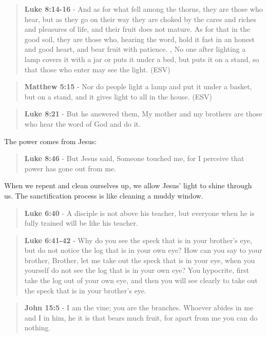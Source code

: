 \documentclass[11pt]{article}
\begin{document}
\begin{quote}
\textbf{Luke 8:14-16} - And as for what fell among the thorns, they are those who hear, but as they go on their way they are choked by the cares and riches and pleasures of life, and their fruit does not mature. As for that in the good soil, they are those who, hearing the word, hold it fast in an honest and good heart, and bear fruit with patience. , No one after lighting a lamp covers it with a jar or puts it under a bed, but puts it on a stand, so that those who enter may see the light. (ESV)
\end{quote}

\begin{quote}
\textbf{Matthew 5:15} - Nor do people light a lamp and put it under a basket, but on a stand, and it gives light to all in the house. (ESV)
\end{quote}

\begin{quote}
\textbf{Luke 8:21} - But he answered them, My mother and my brothers are those who hear the word of God and do it.
\end{quote}

The power comes from Jesus:

\begin{quote}
\textbf{Luke 8:46} - But Jesus said, Someone touched me, for I perceive that power has gone out from me.
\end{quote}

When we repent and clean ourselves up, we allow Jesus' light to shine through us. The sanctification process is like cleaning a muddy window.

\begin{quote}
\textbf{Luke 6:40} - A disciple is not above his teacher, but everyone when he is fully trained will be like his teacher.
\end{quote}

\begin{quote}
\textbf{Luke 6:41-42} - Why do you see the speck that is in your brother's eye, but do not notice the log that is in your own eye? How can you say to your brother, Brother, let me take out the speck that is in your eye, when you yourself do not see the log that is in your own eye? You hypocrite, first take the log out of your own eye, and then you will see clearly to take out the speck that is in your brother's eye.
\end{quote}

\begin{quote}
\textbf{John 15:5} - I am the vine; you are the branches. Whoever abides in me and I in him, he it is that bears much fruit, for apart from me you can do nothing.
\end{quote}
\end{document}
